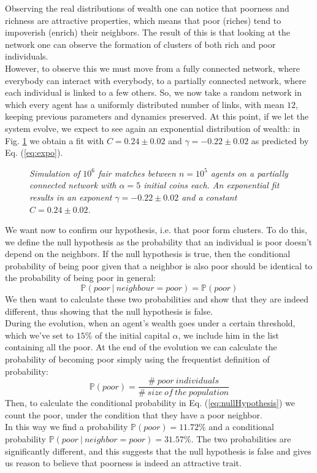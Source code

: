 Observing the real distributions of wealth one can notice that poorness and richness are attractive properties, which means that poor (riches) tend to impoverish (enrich) their neighbors.
The result of this is that looking at the network one can observe the formation of clusters of both rich and poor individuals. \\
However, to observe this we must move from a fully connected network, where everybody can interact with everybody, to a partially connected network, where each individual is linked to a few others.
So, we now take a random network in which every agent has a uniformly distributed number of links, with mean $12$, keeping previous parameters and dynamics preserved.
At this point, if we let the system evolve, we expect to see again an exponential distribution of wealth: in Fig. \ref{fig:fixedExpo} we obtain a fit with $C = 0.24 \pm 0.02$ and $\gamma = -0.22 \pm 0.02$ as predicted by Eq. (\ref{eq:expo}).
\begin{figure}[H]
    \centering
    \scalebox{.7}{}
    \caption{\emph{Simulation of $10^6$ fair matches between $n = 10^5$ agents on a partially connected network with $\alpha = 5$ initial coins each. 
                    An exponential fit results in an exponent $\gamma = -0.22 \pm 0.02$ and a constant $C = 0.24 \pm 0.02$.}}
    \label{fig:fixedExpo}
\end{figure}
We want now to confirm our hypothesis, i.e. that poor form clusters.
To do this, we define the null hypothesis as the probability that an individual is poor doesn't depend on the neighbors.
If the null hypothesis is true, then the conditional probability of being poor given that a neighbor is also poor should be identical to the probability of being poor in general:
\begin{equation}
    \mathbb{P}(poor \ | \ neighbour=poor) = \mathbb{P}(poor)
	\label{eq:nullHypothesis}
\end{equation}
We then want to calculate these two probabilities and show that they are indeed different, thus showing that the null hypothesis is false. \\
During the evolution, when an agent's wealth goes under a certain threshold, which we've set to $15 \%$ of the initial capital $\alpha$, we include him in the list containing all the poor.
At the end of the evolution we can calculate the probability of becoming poor simply using the frequentist definition of probability:
$$
	\mathbb{P}(poor) = \frac{\# \ poor \ individuals}{\# \ size \ of \ the \ population}
$$
Then, to calculate the conditional probability in Eq. (\ref{eq:nullHypothesis}) we count the poor, under the condition that they have a poor neighbor. \\
In this way we find a probability $\mathbb{P}(poor) = 11.72 \%$ and a conditional probability $\mathbb{P}(poor \ | \ neighbor=poor) = 31.57 \%$.
The two probabilities are significantly different, and this suggests that the null hypothesis is false and gives us reason to believe that poorness is indeed an attractive trait.
